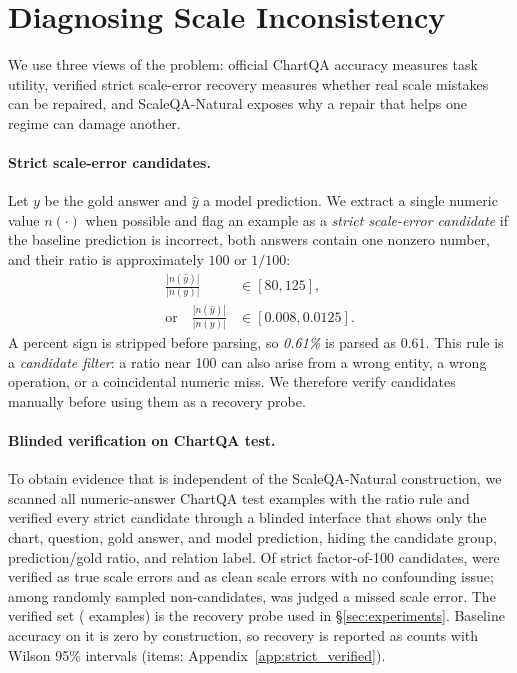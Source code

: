 \section{Diagnosing Scale Inconsistency}

We use three views of the problem: official ChartQA accuracy measures task utility, verified strict scale-error recovery measures whether real scale mistakes can be repaired, and ScaleQA-Natural exposes why a repair that helps one regime can damage another.

\paragraph{Strict scale-error candidates.}
\label{sec:strict}
Let $y$ be the gold answer and $\hat{y}$ a model prediction. We extract a single numeric value $n(\cdot)$ when possible and flag an example as a \emph{strict scale-error candidate} if the baseline prediction is incorrect, both answers contain one nonzero number, and their ratio is approximately $100$ or $1/100$:
\begin{equation}
\begin{aligned}
\frac{|n(\hat{y})|}{|n(y)|} &\in [80,125], \\
\text{or}\quad
\frac{|n(\hat{y})|}{|n(y)|} &\in [0.008,0.0125].
\end{aligned}
\end{equation}
A percent sign is stripped before parsing, so \textit{0.61\%} is parsed as $0.61$. This rule is a \emph{candidate filter}: a ratio near 100 can also arise from a wrong entity, a wrong operation, or a coincidental numeric miss. We therefore verify candidates manually before using them as a recovery probe.

\paragraph{Blinded verification on ChartQA test.}
To obtain evidence that is independent of the ScaleQA-Natural construction, we scanned all numeric-answer ChartQA test examples with the ratio rule and verified every strict candidate through a blinded interface that shows only the chart, question, gold answer, and model prediction, hiding the candidate group, prediction/gold ratio, and relation label. Of  strict factor-of-100 candidates,  were verified as true scale errors and  as clean scale errors with no confounding issue; among  randomly sampled non-candidates,  was judged a missed scale error. The verified set ( examples) is the recovery probe used in \S\ref{sec:experiments}. Baseline accuracy on it is zero by construction, so recovery is reported as counts with Wilson 95\% intervals (items: Appendix~\ref{app:strict_verified}).

